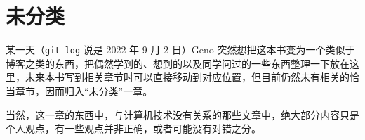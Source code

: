 \chapter{未分类}\label{ch:Uncategorized}
    某一天（\texttt{git log} 说是 2022 年 9 月 2 日）Geno 突然想把这本书变为一个类似于博客之类的东西，把偶然学到的、想到的以及同学问过的一些东西整理一下放在这里，未来本书写到相关章节时可以直接移动到对应位置，但目前仍然未有相关的恰当章节，因而归入“未分类”一章。

    当然，这一章的东西中，与计算机技术没有关系的那些文章中，绝大部分内容只是个人观点，有一些观点并非正确，或者可能没有对错之分。
